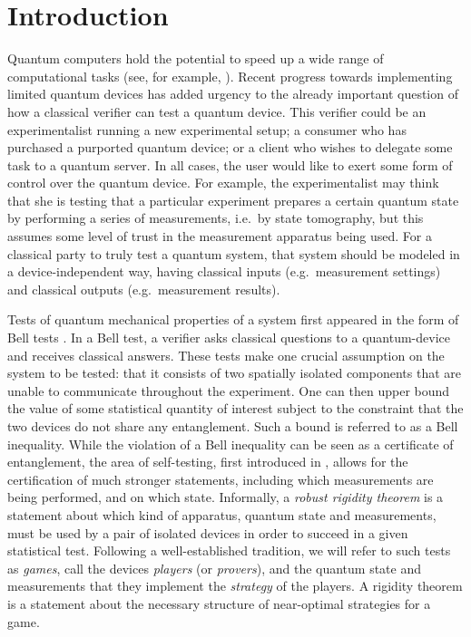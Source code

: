 
\section{Introduction}

Quantum computers hold the potential to speed up a wide range of computational tasks (see, for example, \cite{montanaro2016survey}). Recent progress towards implementing limited quantum devices has added urgency to the already important question of how a classical verifier can test a quantum device. This verifier could be an experimentalist running a new experimental setup; a consumer who has purchased a purported quantum device; or a client who wishes to delegate some task to a quantum server. In all cases, the user would like to exert some form of control over the quantum device. For example, the experimentalist may think that she is testing that a particular experiment prepares a certain quantum state by performing a series of measurements, i.e.\ by state tomography, but this assumes some level of trust in the measurement apparatus being used.  For a classical party to truly test a quantum system, that system should be modeled in a device-independent way, having classical inputs (e.g.\ measurement settings) and classical outputs (e.g.\ measurement results). 

Tests of quantum mechanical properties of a system first appeared in the form of Bell tests \cite{Bell:64a,Clauser:69a}. In a Bell test, a verifier asks classical questions to a quantum-device and receives classical answers. These tests make one crucial assumption on the system to be tested: that it consists of two spatially isolated components that %
are unable to communicate throughout the experiment. One can then upper bound the value of some statistical quantity of interest subject to the constraint that the two devices do not share any entanglement. Such a bound is referred to as a Bell inequality. While the violation of a Bell inequality can be seen as a certificate of entanglement, the area of self-testing, first introduced in \cite{mayers2004selftesting}, allows for the certification of much stronger statements, including  which measurements are being performed, and on which state.  Informally, a \emph{robust rigidity theorem} is a statement about which kind of apparatus, quantum state and measurements, must be used by a pair of isolated devices in order to succeed in a given statistical test. Following a well-established tradition, we will refer to such tests as \emph{games}, call the devices \emph{players} (or \emph{provers}), and the quantum state and measurements that they implement the \emph{strategy} of the players. A rigidity theorem is a statement about the necessary structure of near-optimal strategies for a game.  

